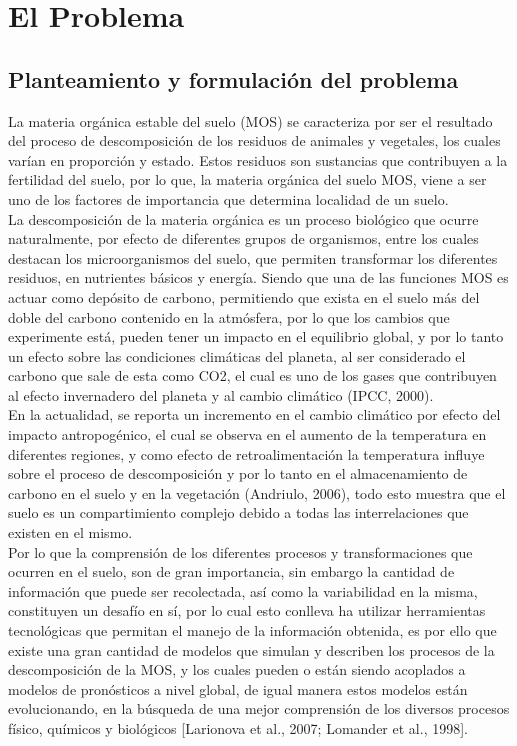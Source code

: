 \chapter{El Problema}

\section{Planteamiento y formulaci\'on del problema}
La materia org\'anica estable del suelo (MOS) se caracteriza por ser el resultado del proceso de descomposici\'on de los residuos de animales y vegetales, los cuales varían en proporci\'on y estado. Estos residuos son sustancias que contribuyen a la fertilidad del suelo, por lo que,  la materia org\'anica del suelo MOS, viene a ser uno de los factores de importancia que determina localidad de un suelo.\\

La descomposici\'on de la materia org\'anica es un proceso biol\'ogico que ocurre naturalmente, por efecto de diferentes grupos de organismos, entre los cuales destacan los microorganismos del suelo, que permiten transformar los diferentes residuos, en nutrientes b\'asicos y energía. Siendo que una de las funciones MOS es actuar como dep\'osito de carbono, permitiendo que exista en el suelo m\'as del doble del carbono contenido en la atm\'osfera, por lo que los cambios que experimente est\'a, pueden tener un impacto en el equilibrio global, y por lo tanto un efecto sobre las condiciones clim\'aticas del planeta, al ser considerado el carbono que sale de esta como CO2, el cual es uno de los gases que contribuyen al efecto invernadero del planeta y al cambio clim\'atico (IPCC, 2000).\\

En la actualidad, se reporta un incremento en el cambio clim\'atico por efecto del impacto antropog\'enico, el cual se observa en el aumento de la temperatura en diferentes regiones, y como efecto de retroalimentaci\'on la temperatura influye sobre el proceso de descomposici\'on y por lo tanto en el almacenamiento de carbono en el suelo y en la vegetaci\'on (Andriulo, 2006), todo esto muestra que el suelo es un compartimiento complejo debido a todas las interrelaciones que existen en el mismo.\\

Por lo que la comprensi\'on de los diferentes procesos y transformaciones que ocurren en el suelo, son de gran importancia, sin embargo la cantidad de informaci\'on que puede ser recolectada, así como la variabilidad en la misma, constituyen un desafío en sí, por lo cual esto conlleva ha utilizar herramientas tecnol\'ogicas que permitan el manejo de la informaci\'on obtenida, es por ello que existe una gran cantidad de modelos que simulan y describen los procesos de la descomposici\'on de la MOS, y los cuales pueden o est\'an siendo acoplados a modelos de pron\'osticos a nivel global, de igual manera estos modelos est\'an evolucionando, en la b\'usqueda de una mejor comprensi\'on de los diversos procesos físico, químicos y biol\'ogicos [Larionova et al., 2007; Lomander et al., 1998].\\

